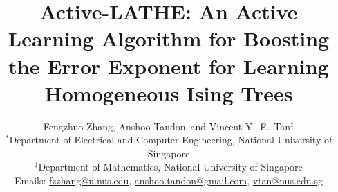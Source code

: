 \title{Active-LATHE: An Active Learning Algorithm for Boosting the Error Exponent for Learning Homogeneous Ising Trees} 
\date{}
 



\author{Fengzhuo Zhang\footnotemark[1], Anshoo Tandon\footnotemark[1] \footnotemark[2] $\,$ and Vincent Y.~F.~Tan$^\ddagger$ \\ $^*$Department of Electrical and Computer Engineering, National University of Singapore \\
$^\ddagger$Department of Mathematics, National University of Singapore \\
Emails: \url{fzzhang@u.nus.edu}, \url{anshoo.tandon@gmail.com}, \url{vtan@nus.edu.sg}}



\maketitle

\renewcommand{\thefootnote}{\fnsymbol{footnote}}

